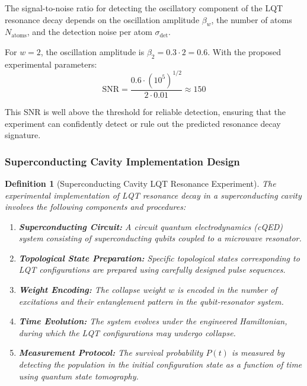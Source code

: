 \documentclass[11pt,a4paper]{article}
\makeatletter
\newtheorem{definition}[theorem]{Definition}
\renewenvironment{proof}[1][\proofname]{\par
  \pushQED{\qed}%
  \normalfont \topsep6\p@\@plus6\p@\relax
  \trivlist
  \item[\hskip\labelsep
        \itshape
    #1\@addpunct{.}]\ignorespaces
}{%
  \popQED\endtrivlist\@endpefalse
}
\makeatother
\begin{document}
\begin{proof}
The signal-to-noise ratio for detecting the oscillatory component of the LQT resonance decay depends on the oscillation amplitude $\beta_w$, the number of atoms $N_{\text{atoms}}$, and the detection noise per atom $\sigma_{\text{det}}$.

For $w=2$, the oscillation amplitude is $\beta_2 = 0.3 \cdot 2 = 0.6$. With the proposed experimental parameters:
\begin{equation}
\text{SNR} = \frac{0.6 \cdot (10^5)^{1/2}}{2 \cdot 0.01} \approx 150
\end{equation}

This SNR is well above the threshold for reliable detection, ensuring that the experiment can confidently detect or rule out the predicted resonance decay signature.
\end{proof}

\subsubsection{Superconducting Cavity Implementation Design}
\label{ssubsec:superconducting_cavity}

\begin{definition}[Superconducting Cavity LQT Resonance Experiment]
\label{def:superconducting_cavity}
The experimental implementation of LQT resonance decay in a superconducting cavity involves the following components and procedures:

\begin{enumerate}
    \item \textbf{Superconducting Circuit:} A circuit quantum electrodynamics (cQED) system consisting of superconducting qubits coupled to a microwave resonator.
    
    \item \textbf{Topological State Preparation:} Specific topological states corresponding to LQT configurations are prepared using carefully designed pulse sequences.
    
    \item \textbf{Weight Encoding:} The collapse weight $w$ is encoded in the number of excitations and their entanglement pattern in the qubit-resonator system.
    
    \item \textbf{Time Evolution:} The system evolves under the engineered Hamiltonian, during which the LQT configurations may undergo collapse.
    
    \item \textbf{Measurement Protocol:} The survival probability $P(t)$ is measured by detecting the population in the initial configuration state as a function of time using quantum state tomography.
\end{enumerate}
\end{definition}
\end{document}
